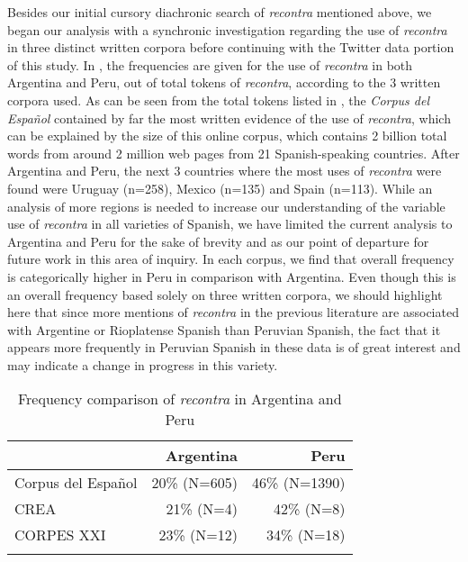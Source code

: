 \documentclass[output=paper,colorlinks,citecolor=brown,
]{langscibook}
\begin{document}
Besides our initial cursory diachronic search of \textit{recontra} mentioned above, we began our analysis with a synchronic investigation regarding the use of \textit{recontra} in three distinct written corpora before continuing with the Twitter data portion of this study. In , the frequencies are given for the use of \textit{recontra} in both Argentina and Peru, out of total tokens of \textit{recontra}, according to the 3 written corpora used. As can be seen from the total tokens listed in , the \textit{Corpus del Español} \citep{Davies2016} contained by far the most written evidence of the use of \textit{recontra}, which can be explained by the size of this online corpus, which contains 2 billion total words from around 2 million web pages from 21 Spanish-speaking countries. After Argentina and Peru, the next 3 countries where the most uses of \textit{recontra} were found were Uruguay (n=258), Mexico (n=135) and Spain (n=113). While an analysis of more regions is needed to increase our understanding of the variable use of \textit{recontra} in all varieties of Spanish, we have limited the current analysis to Argentina and Peru for the sake of brevity and as our point of departure for future work in this area of inquiry. In each corpus, we find that overall frequency is categorically higher in Peru in comparison with Argentina. Even though this is an overall frequency based solely on three written corpora, we should highlight here that since more mentions of \textit{recontra} in the previous literature are associated with Argentine or Rioplatense Spanish than Peruvian Spanish, the fact that it appears more frequently in Peruvian Spanish in these data is of great interest and may indicate a change in progress in this variety. 


\begin{table}
\caption{Frequency comparison of \textit{recontra} in Argentina and Peru}
\label{tab:hair:1:frequencies}
 \begin{tabular}{l rr}
  \lsptoprule
             & Argentina & Peru\\
  \midrule
  Corpus del Español \citep{Davies2016} & 20\% (N=605) & 46\% (N=1390)\\
  CREA \citep{RAECREA}  & 21\% (N=4) & 42\% (N=8)\\
  CORPES XXI \citep{RAECORDE} & 23\% (N=12) & 34\% (N=18)\\
  \lspbottomrule
  \end{tabular}
\end{table}
\end{document}
